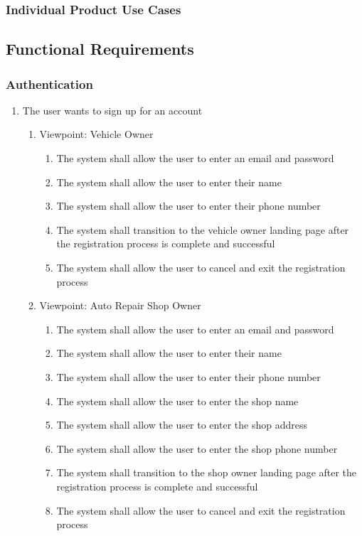 \documentclass[12pt]{article}
\begin{document}
\subsubsection{Individual Product Use Cases}

\subsection{Functional Requirements}
\subsubsection{Authentication}
\begin{enumerate}[label=BE\arabic*., series=business_events]
	\item The user wants to sign up for an account
	      \begin{enumerate}[VP\arabic*.]
		      \item Viewpoint: Vehicle Owner
		            \begin{enumerate}
			            \item The system shall allow the user to enter an email and password
			            \item The system shall allow the user to enter their name
			            \item The system shall allow the user to enter their phone number
			            \item The system shall transition to the vehicle owner landing page after the registration process is
			                  complete and successful
			            \item The system shall allow the user to cancel and exit the registration process
		            \end{enumerate}

		      \item Viewpoint: Auto Repair Shop Owner
		            \begin{enumerate}
			            \item The system shall allow the user to enter an email and password
			            \item The system shall allow the user to enter their name
			            \item The system shall allow the user to enter their phone number
			            \item The system shall allow the user to enter the shop name
			            \item The system shall allow the user to enter the shop address
			            \item The system shall allow the user to enter the shop phone number
			            \item The system shall transition to the shop owner landing page after the registration process is
			                  complete and successful
			            \item The system shall allow the user to cancel and exit the registration process
		            \end{enumerate}


\end{enumerate}
\end{enumerate}
\end{document}
